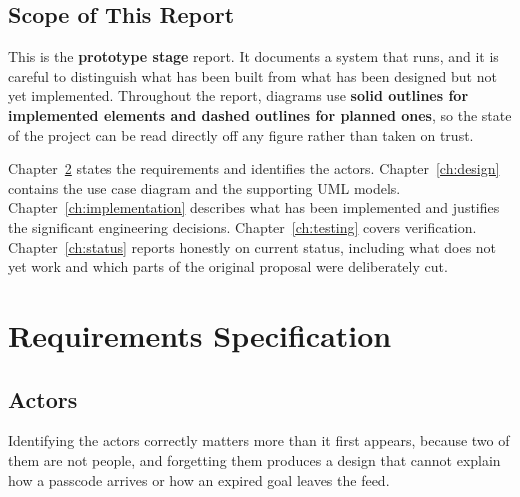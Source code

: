 \documentclass[twoside,12pt]{tietreport}
\begin{document}
\section{Scope of This Report}

This is the \textbf{prototype stage} report. It documents a system that runs, and
it is careful to distinguish what has been built from what has been designed but
not yet implemented. Throughout the report, diagrams use \textbf{solid outlines
for implemented elements and dashed outlines for planned ones}, so the state of
the project can be read directly off any figure rather than taken on trust.

Chapter~\ref{ch:requirements} states the requirements and identifies the actors.
Chapter~\ref{ch:design} contains the use case diagram and the supporting UML
models. Chapter~\ref{ch:implementation} describes what has been implemented and
justifies the significant engineering decisions. Chapter~\ref{ch:testing}
covers verification. Chapter~\ref{ch:status} reports honestly on current status,
including what does not yet work and which parts of the original proposal were
deliberately cut.

\chapter{Requirements Specification}
\label{ch:requirements}

\section{Actors}

Identifying the actors correctly matters more than it first appears, because two
of them are not people, and forgetting them produces a design that cannot explain
how a passcode arrives or how an expired goal leaves the feed.
\end{document}
